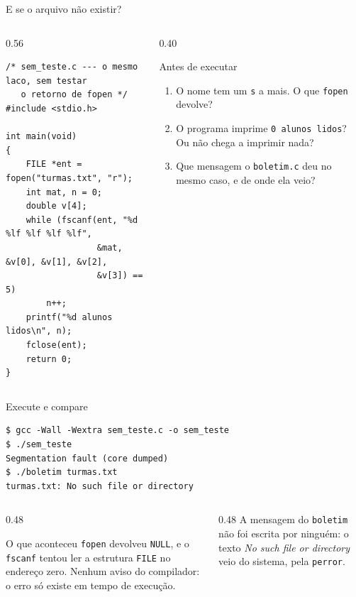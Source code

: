\documentclass[aspectratio=169]{beamer}
\begin{document}
\begin{frame}[fragile]{E se o arquivo não existir?}
  \vspace{-0.3em}
  \begin{columns}[T]
    \begin{column}{0.56\textwidth}
\begin{lstlisting}[style=codC]
/* sem_teste.c --- o mesmo laco, sem testar
   o retorno de fopen */
#include <stdio.h>

int main(void)
{
    FILE *ent = fopen("turmas.txt", "r");
    int mat, n = 0;
    double v[4];
    while (fscanf(ent, "%d %lf %lf %lf %lf",
                  &mat, &v[0], &v[1], &v[2],
                  &v[3]) == 5)
        n++;
    printf("%d alunos lidos\n", n);
    fclose(ent);
    return 0;
}
\end{lstlisting}
    \end{column}
    \begin{column}{0.40\textwidth}
      \begin{block}{Antes de executar}
        \small
        \begin{enumerate}
          \item O nome tem um \texttt{s} a mais. O que \texttt{fopen}
            devolve?
          \item O programa imprime \texttt{0 alunos lidos}? Ou não chega
            a imprimir nada?
          \item Que mensagem o \texttt{boletim.c} deu no mesmo caso, e de
            onde ela veio?
        \end{enumerate}
      \end{block}
    \end{column}
  \end{columns}
\end{frame}

\begin{frame}[fragile]{Execute e compare}
\begin{lstlisting}[style=shellStyle]
$ gcc -Wall -Wextra sem_teste.c -o sem_teste
$ ./sem_teste
Segmentation fault (core dumped)
$ ./boletim turmas.txt
turmas.txt: No such file or directory
\end{lstlisting}
  \begin{columns}[T]
    \begin{column}{0.48\textwidth}
      \begin{block}{O que aconteceu}
        \small \texttt{fopen} devolveu \texttt{NULL}, e o \texttt{fscanf}
        tentou ler a estrutura \texttt{FILE} no endereço zero. Nenhum aviso
        do compilador: o erro só existe em tempo de execução.
      \end{block}
    \end{column}
    \begin{column}{0.48\textwidth}
      \small A mensagem do \texttt{boletim} não foi escrita por ninguém: o
      texto \emph{No such file or directory} veio do sistema, pela
      \texttt{perror}.
    \end{column}
  \end{columns}
\end{frame}
\end{document}
